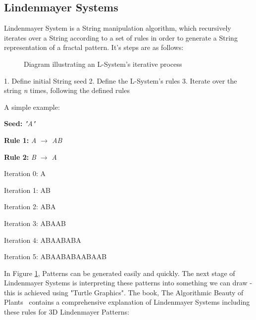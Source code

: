 \documentclass[a4paper,10pt]{report}
\begin{document}
\subsection{Lindenmayer Systems}

Lindenmayer System is a String manipulation algorithm, which recursively iterates over a String according to a set of rules in order to generate a String representation of a fractal pattern. It's steps are as follows:

\begin{figure}
\centering
 \caption{Diagram illustrating an L-System's iterative process}
 \label{fig:l_system_AB}
\end{figure}

1. Define initial String seed
2. Define the L-System's rules
3. Iterate over the string \textit{n} times, following the defined rules


A simple example:\medskip

\textbf{Seed:} \textit{"A"}

\textbf{Rule 1:} \textit{A $\rightarrow$ AB}

\textbf{Rule 2:} \textit{B $\rightarrow$ A}


Iteration 0: A

Iteration 1: AB

Iteration 2: ABA

Iteration 3: ABAAB

Iteration 4: ABAABABA

Iteration 5: ABAABABAABAAB\medskip



In Figure \ref{fig:l_system_AB}, Patterns can be generated easily and quickly. The next stage of Lindenmayer Systems is interpreting these patterns into something we can draw - this is achieved using "Turtle Graphics". The book, The Algorithmic Beauty of Plants~\cite{prusinkiewicz2012algorithmic} contains a comprehensive explanation of Lindenmayer Systems including these rules for 3D Lindenmayer Patterns:\medskip
\end{document}
